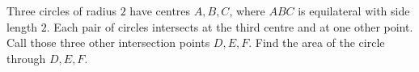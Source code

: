 Three circles of radius $2$ have centres $A,B,C$, where $ABC$ is equilateral with side length $2$. Each pair of circles intersects at the third centre and at one other point. Call those three other intersection points $D,E,F$. Find the area of the circle through $D,E,F$.
